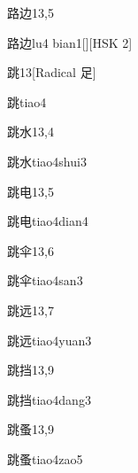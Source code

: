 \begin{entry}{路边}{13,5}
  \begin{phonetics}{路边}{lu4 bian1}[][HSK 2]
  \end{phonetics}
\end{entry}

\begin{entry}{跳}{13}[Radical 足]
  \begin{phonetics}{跳}{tiao4}
  \end{phonetics}
\end{entry}

\begin{entry}{跳水}{13,4}
  \begin{phonetics}{跳水}{tiao4shui3}
  \end{phonetics}
\end{entry}

\begin{entry}{跳电}{13,5}
  \begin{phonetics}{跳电}{tiao4dian4}
  \end{phonetics}
\end{entry}

\begin{entry}{跳伞}{13,6}
  \begin{phonetics}{跳伞}{tiao4san3}
  \end{phonetics}
\end{entry}

\begin{entry}{跳远}{13,7}
  \begin{phonetics}{跳远}{tiao4yuan3}
  \end{phonetics}
\end{entry}

\begin{entry}{跳挡}{13,9}
  \begin{phonetics}{跳挡}{tiao4dang3}
  \end{phonetics}
\end{entry}

\begin{entry}{跳蚤}{13,9}
  \begin{phonetics}{跳蚤}{tiao4zao5}
  \end{phonetics}
\end{entry}


